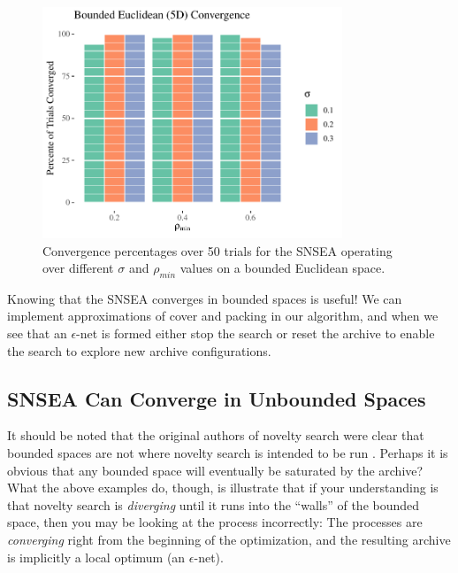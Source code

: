 \documentclass[twoside]{article}
\begin{document}
%
\begin{figure}[t]
  \center\includegraphics[width=0.8\textwidth]{Figures/bounded-conv-NOPOP.pdf}
  \caption{\label{fig:bounded:nopop:conv} Convergence percentages over 50 trials for the SNSEA operating over different $\sigma$ and $\rho_{min}$ values on a bounded Euclidean space.}
\end{figure}
%

Knowing that the SNSEA converges in bounded spaces is useful! We can implement approximations of cover and packing in our algorithm, and when we see that an $\epsilon$-net is formed either stop the search or reset the archive to enable the search to explore new archive configurations.  


\subsection{SNSEA Can Converge in Unbounded Spaces}
\label{subsec:unbounded}

It should be noted that the original authors of novelty search were clear that bounded spaces are not where novelty search is intended to be run \citep{LehmanStanley2008ssls}.  Perhaps it is obvious that any bounded space will eventually be saturated by the archive?  What the above examples do, though, is illustrate that if your understanding is that novelty search is \emph{diverging} until it runs into the ``walls'' of the bounded space, then you may be looking at the process incorrectly:  The processes are \emph{converging} right from the beginning of the optimization, and the resulting archive is implicitly a local optimum (an $\epsilon$-net).
\end{document}

